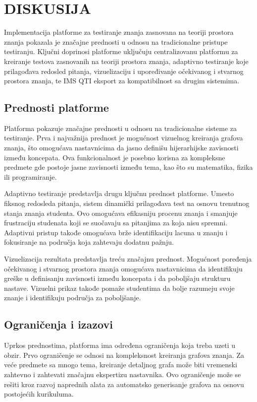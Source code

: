 \documentclass[conference]{IEEEtran}
\begin{document}
\section{DISKUSIJA}

Implementacija platforme za testiranje znanja zasnovana na teoriji prostora znanja pokazala je značajne prednosti u odnosu na tradicionalne pristupe testiranju. Ključni doprinosi platforme uključuju centralizovanu platformu za kreiranje testova zasnovanih na teoriji prostora znanja, adaptivno testiranje koje prilagođava redosled pitanja, vizuelizaciju i upoređivanje očekivanog i stvarnog prostora znanja, te IMS QTI eksport za kompatibilnost sa drugim sistemima.

\subsection{Prednosti platforme}

Platforma pokazuje značajne prednosti u odnosu na tradicionalne sisteme za testiranje. Prva i najvažnija prednost je mogućnost vizuelnog kreiranja grafova znanja, što omogućava nastavnicima da jasno definišu hijerarhijske zavisnosti između koncepata. Ova funkcionalnost je posebno korisna za kompleksne predmete gde postoje jasne zavisnosti između tema, kao što su matematika, fizika ili programiranje.

Adaptivno testiranje predstavlja drugu ključnu prednost platforme. Umesto fiksnog redosleda pitanja, sistem dinamički prilagođava test na osnovu trenutnog stanja znanja studenta. Ovo omogućava efikasniju procenu znanja i smanjuje frustraciju studenata koji se suočavaju sa pitanjima za koja nisu spremni. Adaptivni pristup takođe omogućava brže identifikaciju lacuna u znanju i fokusiranje na područja koja zahtevaju dodatnu pažnju.

Vizuelizacija rezultata predstavlja treću značajnu prednost. Mogućnost poređenja očekivanog i stvarnog prostora znanja omogućava nastavnicima da identifikuju greške u definisanju zavisnosti između koncepata i da poboljšaju strukturu nastave. Vizuelni prikaz takođe pomaže studentima da bolje razumeju svoje znanje i identifikuju područja za poboljšanje.

\subsection{Ograničenja i izazovi}

Uprkos prednostima, platforma ima određena ograničenja koja treba uzeti u obzir. Prvo ograničenje se odnosi na kompleksnost kreiranja grafova znanja. Za veće predmete sa mnogo tema, kreiranje detaljnog grafa može biti vremenski zahtevno i zahtevati značajnu ekspertizu nastavnika. Ovo ograničenje može se rešiti kroz razvoj naprednih alata za automatsko generisanje grafova na osnovu postojećih kurikuluma.
\end{document}
